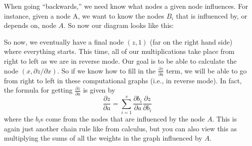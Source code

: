 When going ``backwards,'' we need know what nodes a given node influences. For instance, given a node A, we want to know the nodes $B_i$ that is influenced by, or depends on, node $A$. So now our diagram looks like this: 
\begin{figure}[ht]
\begin{center}
\end{center}
\end{figure}

So now, we eventually have a final node $(z,1)$ (far on the right hand side) where everything starts. This time, all of our multiplications take place from right to left as we are in reverse mode. Our goal is to be able to calculate the node $(x,\partial z/\partial x)$. So if we know how to fill in the $\frac{\partial z}{\partial a}$ term, we will be able to go from right to left in these computational graphs (i.e., in reverse mode). In fact, the formula for getting $\frac{\partial z}{\partial a}$ is given by 
\[
\frac{\partial z}{\partial a} = \sum_{i=1}^s \frac{\partial b_i}{\partial a} \frac{\partial z}{\partial b_i}
\]
where the $b_i$s come from the nodes that are influenced by the node $A$. This is again just another chain rule like from calculus, but you can also view this as multiplying the sums of all the weights in the graph influenced by $A$.


